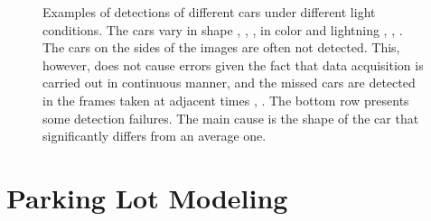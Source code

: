 \begin{figure}[p]
\caption{Examples of detections of different cars under different light conditions. The cars vary in shape , , ,  in color and lightning , , . The cars on the sides of the images are often not detected. This, however, does not cause errors given the fact that data acquisition is carried out in continuous manner, and the missed cars are detected in the frames taken at adjacent times , . The bottom row presents some detection failures. The main cause is the shape of the car that significantly differs from an average one.}
\label{fig:detection_examples}
\end{figure}


\section{Parking Lot Modeling}
\label{sec:parking_lots_modeling}

